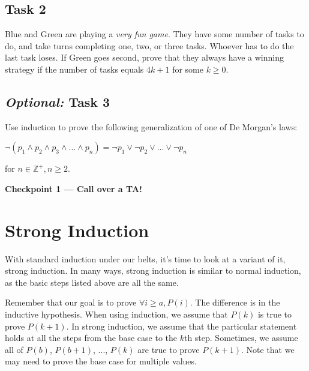 \documentclass[12pt,letterpaper]{article}
\newcommand\Z{\mathbb Z}
\begin{document}
\subsection*{Task 2}
Blue and Green are playing a \textit{very fun game}. They have some number of tasks to do, and take turns completing one, two, or three tasks. Whoever has to do the last task loses. If Green goes second, prove that they always have a winning strategy if the number of tasks equals $4k+1$ for some $k \geq 0$.

\begin{mdframed} \vspace{8cm} \end{mdframed}

	\subsection*{\textit{Optional:} Task 3}

      Use induction to prove the following
      generalization of one of De Morgan's laws:
      \begin{center}
      $\lnot(p_1 \land p_2 \land p_3 \land ... \land p_n) 
      = \lnot p_1 \lor \lnot p_2 \lor ... \lor \lnot p_n$
      \end{center}
      for $n \in \Z^+, n \geq 2$.

	\begin{mdframed} \vspace{8cm} \end{mdframed}
	
\textbf{Checkpoint 1 — Call over a TA!}

\newpage

 \section*{Strong Induction}
 
With standard induction under our belts, it's time to look at a variant of it, strong induction. In many ways, strong induction is similar to normal induction, as the basic steps listed above are all the same.

Remember that our goal is to prove $\forall i\geq a,  P(i)$.
The difference is in the inductive hypothesis. When using induction, we assume that $P(k)$ is true to prove $P(k+1)$. In strong induction, we assume that the particular statement holds at all the steps from the base case to the $k$th step. Sometimes, we assume all of $P(b)$, $P(b+1)$, ..., $P(k)$ are true to prove $P(k+1)$. Note that we may need to prove the base case for multiple values. 
\end{document}
